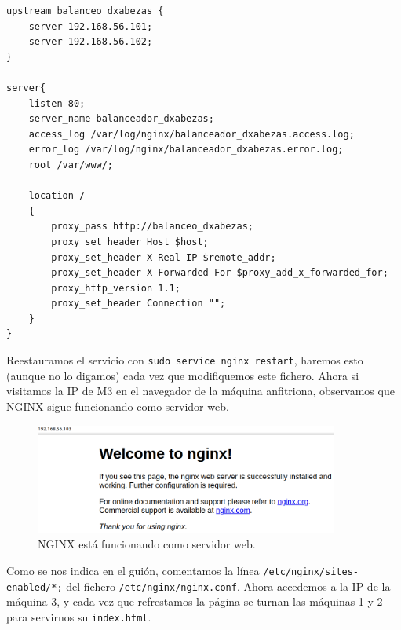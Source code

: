 \documentclass{article}
\begin{document}
\begin{Verbatim}[tabsize=4]
upstream balanceo_dxabezas {
	server 192.168.56.101;
	server 192.168.56.102;
}

server{
	listen 80;
	server_name balanceador_dxabezas;
	access_log /var/log/nginx/balanceador_dxabezas.access.log;
	error_log /var/log/nginx/balanceador_dxabezas.error.log;
	root /var/www/;

	location /
	{
		proxy_pass http://balanceo_dxabezas;
		proxy_set_header Host $host;
		proxy_set_header X-Real-IP $remote_addr;
		proxy_set_header X-Forwarded-For $proxy_add_x_forwarded_for;
		proxy_http_version 1.1;
		proxy_set_header Connection "";
	}
}
\end{Verbatim}

Reestauramos el servicio con \verb^sudo service nginx restart^, haremos esto (aunque no lo digamos) cada vez que
modifiquemos este fichero. Ahora si visitamos la IP de M3
en el navegador de la máquina anfitriona, observamos que NGINX sigue funcionando como servidor
web.

\begin{figure}[H]
	\centering
	\includegraphics[width=100mm]{imgs/nginx-web}
	\caption{NGINX está funcionando como servidor web.}
	\label{fig:nginx-web}
\end{figure}

Como se nos indica en el guión, comentamos la línea \verb^/etc/nginx/sites-enabled/*;^
del fichero \texttt{/etc/nginx/nginx.conf}. Ahora accedemos a la IP de la máquina 3, y cada vez que refrestamos la página
se turnan las máquinas 1 y 2 para servirnos su \texttt{index.html}.

\begin{figure}[H]
	\centering
	\label{fig:index}
\end{figure}
\end{document}
